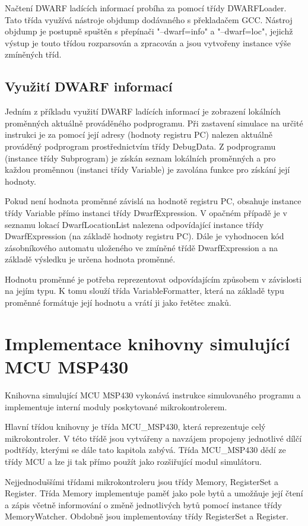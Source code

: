Načtení DWARF ladících informací probíha za pomocí třídy DWARFLoader. Tato třída využívá nástroje objdump dodávaného s překladačem GCC. Nástroj objdump je postupně spuštěn s přepínači "--dwarf=info" a "--dwarf=loc", jejichž výstup je touto třídou rozparsován a zpracován a jsou vytvořeny instance výše zmíněných tříd.

\subsection{Využití DWARF informací}

Jedním z příkladu využití DWARF ladících informací je zobrazení lokálních proměnných aktuálně prováděného podprogramu. Při zastavení simulace na určité instrukci je za pomocí její adresy (hodnoty registru PC) nalezen aktuálně prováděný podprogram prostřednictvím třídy DebugData. Z podprogramu (instance třídy Subprogram) je získán seznam lokálních proměnných a pro každou proměnnou (instanci třídy Variable) je zavolána funkce pro získání její hodnoty.

Pokud není hodnota proměnné závislá na hodnotě registru PC, obsahuje instance třídy Variable přímo instanci třídy DwarfExpression. V opačném případě je v seznamu lokací DwarfLocationList nalezena odpovídající instance třídy DwarfExpression (na základě hodnoty registru PC). Dále je vyhodnocen kód zásobníkového automatu uloženého ve zmíněné třídě DwarfExpression a na základě výsledku je určena hodnota proměnné.

Hodnotu proměnné je potřeba reprezentovat odpovídajícím způsobem v závislosti na jejím typu. K tomu slouží třída VariableFormatter, která na základě typu proměnné formátuje její hodnotu a vrátí ji jako řetětec znaků.

\section{Implementace knihovny simulující MCU MSP430}

Knihovna simulující MCU MSP430 vykonává instrukce simulovaného programu a implementuje interní moduly poskytované mikrokontrolerem.

Hlavní třídou knihovny je třída MCU\_MSP430, která reprezentuje celý mikrokontroler. V této třídě jsou vytvářeny a navzájem propojeny jednotlivé dílčí podtřídy, kterými se dále tato kapitola zabývá. Třída MCU\_MSP430 dědí ze třídy MCU a lze ji tak přímo použít jako rozšiřující modul simulátoru.

Nejjednoduššími třídami mikrokontroleru jsou třídy Memory, RegisterSet a Register. Třída Memory implementuje paměť jako pole bytů a umožňuje její čtení a zápis včetně informování o změně jednotlivých bytů pomocí instance třídy MemoryWatcher. Obdobně jsou implementovány třídy RegisterSet a Register.

